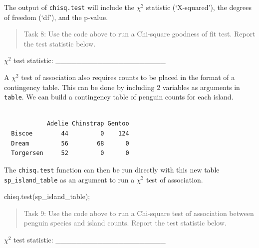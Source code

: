 \documentclass[
]{scrbook}
\newenvironment{Shaded}{\begin{snugshade}}{\end{snugshade}}
\newcommand{\FunctionTok}[1]{\textcolor[rgb]{0.00,0.00,0.00}{#1}}
\newcommand{\NormalTok}[1]{#1}
\newcommand{\OtherTok}[1]{\textcolor[rgb]{0.56,0.35,0.01}{#1}}
\newcommand{\SpecialCharTok}[1]{\textcolor[rgb]{0.00,0.00,0.00}{#1}}
\begin{document}
The output of \texttt{chisq.test} will include the \(\chi^{2}\) statistic (`X-squared'), the degrees of freedom (`df'), and the p-value.

\begin{quote}
Task 8: Use the code above to run a Chi-square goodness of fit test. Report the test statistic below.
\end{quote}

\(\chi^{2}\) test statistic: \_\_\_\_\_\_\_\_\_\_\_\_\_\_\_\_\_\_\_\_\_

A \(\chi^{2}\) test of association also requires counts to be placed in the format of a contingency table.
This can be done by including 2 variables as arguments in \texttt{table}.
We can build a contingency table of penguin counts for each island.

\begin{Shaded}
\end{Shaded}

\begin{verbatim}
           
            Adelie Chinstrap Gentoo
  Biscoe        44         0    124
  Dream         56        68      0
  Torgersen     52         0      0
\end{verbatim}

The \texttt{chisq.test} function can then be run directly with this new table \texttt{sp\_island\_table} as an argument to run a \(\chi^{2}\) test of association.

\begin{Shaded}
\begin{Highlighting}[]
\FunctionTok{chisq.test}\NormalTok{(sp\_island\_table);}
\end{Highlighting}
\end{Shaded}

\begin{quote}
Task 9: Use the code above to run a Chi-square test of association between penguin species and island counts. Report the test statistic below.
\end{quote}

\(\chi^{2}\) test statistic: \_\_\_\_\_\_\_\_\_\_\_\_\_\_\_\_\_\_\_\_\_
\end{document}
